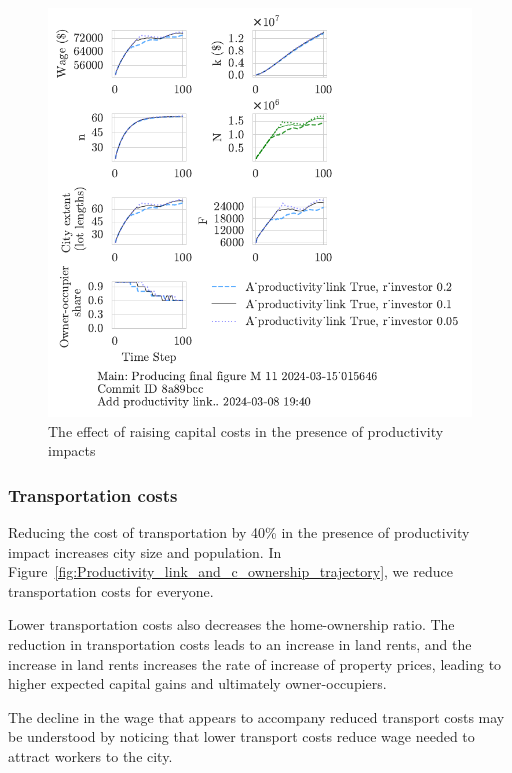 \begin{figure}[h!t]
    \centering
   \includegraphics[scale=.8, trim={0 1.4cm 0 0},clip]{fig/With-productivity_link-r_investor-15_015646.pdf}
    \caption{The effect of raising capital costs in the presence of productivity impacts}
    \label{fig:Productivity_link_and_capital_ownership_trajectory}
\end{figure}

\newpage  
\subsubsection{Transportation costs}
Reducing the cost of transportation by 40\% in the presence of productivity impact increases city size and population. In Figure~\ref{fig:Productivity_link_and_c_ownership_trajectory}, we reduce transportation costs for everyone. 


Lower transportation costs also decreases the home-ownership ratio. The reduction in transportation costs leads to an increase in land rents, and the increase in land rents increases the rate of increase of property prices, leading to higher expected capital gains and ultimately owner-occupiers. 

The decline in the wage that appears to accompany reduced transport costs may be understood by noticing that lower transport costs reduce  wage needed to attract workers to the city. 

